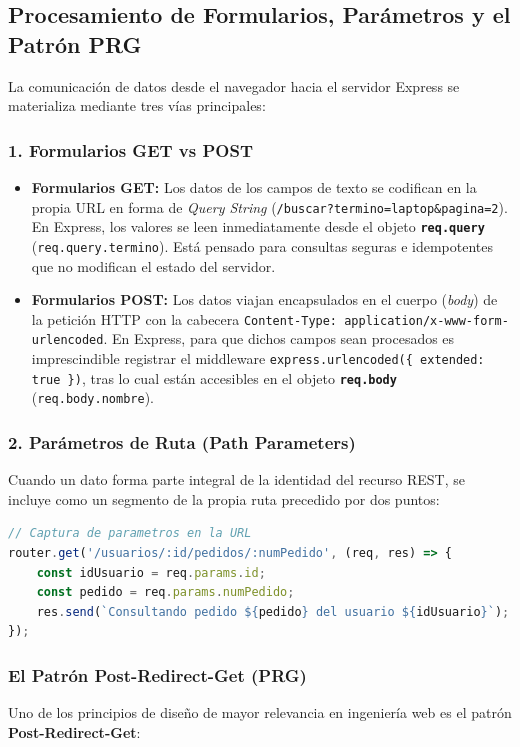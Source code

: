 \subsection{Procesamiento de Formularios, Parámetros y el Patrón PRG}

La comunicación de datos desde el navegador hacia el servidor Express se materializa mediante tres vías principales:

\subsubsection{1. Formularios GET vs POST}
\begin{itemize}
    \item \textbf{Formularios GET:} Los datos de los campos de texto se codifican en la propia URL en forma de \emph{Query String} (\texttt{/buscar?termino=laptop\&pagina=2}). En Express, los valores se leen inmediatamente desde el objeto \textbf{\texttt{req.query}} (\texttt{req.query.termino}). Está pensado para consultas seguras e idempotentes que no modifican el estado del servidor.
    \item \textbf{Formularios POST:} Los datos viajan encapsulados en el cuerpo (\emph{body}) de la petición HTTP con la cabecera \texttt{Content-Type: application/x-www-form-urlencoded}. En Express, para que dichos campos sean procesados es imprescindible registrar el middleware \texttt{express.urlencoded(\{ extended: true \})}, tras lo cual están accesibles en el objeto \textbf{\texttt{req.body}} (\texttt{req.body.nombre}).
\end{itemize}

\subsubsection{2. Parámetros de Ruta (Path Parameters)}
Cuando un dato forma parte integral de la identidad del recurso REST, se incluye como un segmento de la propia ruta precedido por dos puntos:
\begin{lstlisting}[language=javascript]
// Captura de parametros en la URL
router.get('/usuarios/:id/pedidos/:numPedido', (req, res) => {
    const idUsuario = req.params.id;
    const pedido = req.params.numPedido;
    res.send(`Consultando pedido ${pedido} del usuario ${idUsuario}`);
});
\end{lstlisting}

\subsubsection{El Patrón Post-Redirect-Get (PRG)}
Uno de los principios de diseño de mayor relevancia en ingeniería web es el patrón \textbf{Post-Redirect-Get}:

